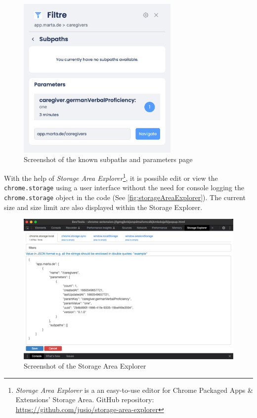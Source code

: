 \begin{figure}[H]
  \centering
  \includegraphics[width=0.7\textwidth]{assets/screenshot_filtre_parameters.png}
  \caption{Screenshot of the known subpaths and parameters page}
  \label{fig:filtreParameters}
\end{figure}

With the help of \emph{Storage Area Explorer}\footnote{\emph{Storage Area Explorer} is a an easy-to-use editor for Chrome Packaged Apps \& Extensions' Storage Area. GitHub repository: \url{https://github.com/jusio/storage-area-explorer}}, it is possible edit or view the \texttt{chrome.storage} using a user interface without the need for console logging the \texttt{chrome.storage} object in the code (See \autoref{fig:storageAreaExplorer}). The current size and size limit are also displayed within the Storage Explorer.

\begin{figure}[H]
  \includegraphics[width=\textwidth]{assets/screenschot_storage_area_explorer.png}
  \caption{Screenshot of the Storage Area Explorer}
  \label{fig:storageAreaExplorer}
\end{figure}

